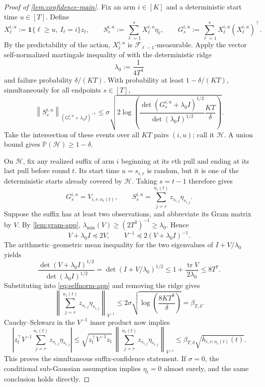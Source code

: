 \documentclass[11pt]{article}
\theoremstyle{remark}
\newcommand{\Pp}{\mathbb P}
\newcommand{\cF}{\mathcal F}
\newcommand{\ind}{\mathbf 1}
\newcommand{\norm}[1]{\left\lVert #1\right\rVert}
\newcommand{\tr}{\operatorname{tr}}
\begin{document}
\begin{proof}[Proof of \cref{lem:confidence-main}]
Fix an arm $i\in[K]$ and a deterministic start time $u\in[T]$. Define
\[
X_\ell^{i,u}:=\ind\{\ell\ge u,\ I_\ell=i\}z_\ell,
\qquad
S_s^{i,u}:=\sum_{\ell=1}^s X_\ell^{i,u}\eta_\ell,
\qquad
G_s^{i,u}:=\sum_{\ell=1}^s
X_\ell^{i,u}(X_\ell^{i,u})^\top.
\]
By the predictability of the action, $X_\ell^{i,u}$ is
$\cF_{\ell-1}$-measurable. Apply the vector self-normalized martingale
inequality of \citet{abbasi2011improved} with the deterministic ridge
\[
\lambda_0:=\frac1{4T^4}
\]
and failure probability $\delta/(KT)$. With probability at least
$1-\delta/(KT)$, simultaneously for all endpoints $s\in[T]$,
\begin{equation}\label{eq:selfnorm-app}
\norm{S_s^{i,u}}_{(G_s^{i,u}+\lambda_0I)^{-1}}
\le
\sigma\sqrt{2\log\!\left(
\frac{\det(G_s^{i,u}+\lambda_0I)^{1/2}}
{\det(\lambda_0I)^{1/2}}\frac{KT}{\delta}
\right)}.
\end{equation}
Take the intersection of these events over all $KT$ pairs $(i,u)$; call it
$\mathcal H$. A union bound gives $\Pp(\mathcal H)\ge1-\delta$.

On $\mathcal H$, fix any realized suffix of arm $i$ beginning at its $r$th
pull and ending at its last pull before round $t$. Its start time
$u=s_{i,r}$ is random, but it is one of the deterministic starts already
covered by $\mathcal H$. Taking $s=t-1$ therefore gives
\[
G_s^{i,u}=V_{i,r:n_i(t)},
\qquad
S_s^{i,u}=\sum_{j=r}^{n_i(t)}z_{s_{i,j}}\eta_{s_{i,j}}.
\]
Suppose the suffix has at least two observations, and abbreviate its Gram
matrix by $V$. By \cref{lem:gram-app},
$\lambda_{\min}(V)\ge(2T^3)^{-1}\ge\lambda_0$. Hence
\[
V+\lambda_0I\preceq2V,
\qquad
V^{-1}\preceq2(V+\lambda_0I)^{-1}.
\]
The arithmetic--geometric mean inequality for the two eigenvalues of
$I+V/\lambda_0$ yields
\begin{equation}\label{eq:det-ratio-app}
\frac{\det(V+\lambda_0I)^{1/2}}
{\det(\lambda_0I)^{1/2}}
=\det(I+V/\lambda_0)^{1/2}
\le1+\frac{\tr V}{2\lambda_0}
\le8T^7.
\end{equation}
Substituting into \eqref{eq:selfnorm-app} and removing the ridge gives
\begin{equation}\label{eq:unreg-norm-app}
\norm{\sum_{j=r}^{n_i(t)}z_{s_{i,j}}\eta_{s_{i,j}}}_{V^{-1}}
\le
2\sigma\sqrt{\log\!\left(\frac{8KT^8}{\delta}\right)}
=\beta_{T,\delta}.
\end{equation}
Cauchy--Schwarz in the $V^{-1}$ inner product now implies
\[
\left|z_t^\top V^{-1}
\sum_{j=r}^{n_i(t)}z_{s_{i,j}}\eta_{s_{i,j}}\right|
\le
\sqrt{z_t^\top V^{-1}z_t}\,
\norm{\sum_{j=r}^{n_i(t)}z_{s_{i,j}}\eta_{s_{i,j}}}_{V^{-1}}
\le\beta_{T,\delta}\sqrt{h_{i,r:n_i(t)}(t)}.
\]
This proves the simultaneous suffix-confidence statement. If $\sigma=0$,
the conditional sub-Gaussian assumption implies $\eta_t=0$ almost surely,
and the same conclusion holds directly.


\end{proof}
\end{document}
